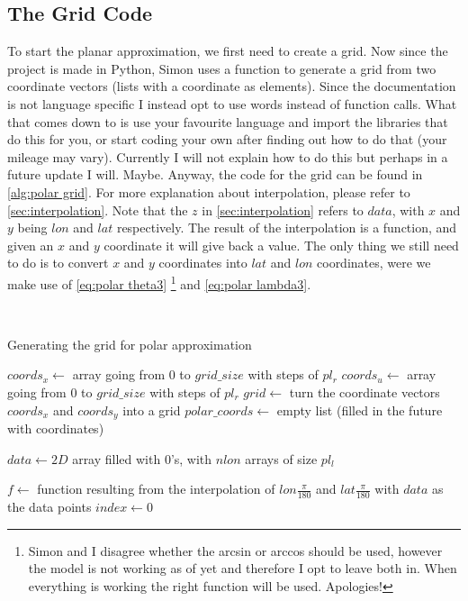 \subsection{The Grid Code}
To start the planar approximation, we first need to create a grid. Now since the project is made in Python, Simon uses a function to generate a grid from two coordinate vectors (lists with a 
coordinate as elements). Since the documentation is not language specific I instead opt to use words instead of function calls. What that comes down to is use your favourite language and import 
the libraries that do this for you, or start coding your own after finding out how to do that (your mileage may vary). Currently I will not explain how to do this but perhaps in a future update 
I will. Maybe. Anyway, the code for the grid can be found in \autoref{alg:polar grid}. For more explanation about interpolation, please refer to \autoref{sec:interpolation}. Note that the $z$ in 
\autoref{sec:interpolation} refers to $data$, with $x$ and $y$ being $lon$ and $lat$ respectively. The result of the interpolation is a function, and given an $x$ and $y$ coordinate it will give 
back a value. The only thing we still need to do is to convert $x$ and $y$ coordinates into $lat$ and $lon$ coordinates, were we make use of \autoref{eq:polar theta3} 
\footnote{Simon and I disagree whether the arcsin or arccos should be used, however the model is not working as of yet and therefore I opt to leave both in. When everything is working the right 
function will be used. Apologies!} and \autoref{eq:polar lambda3}.

\begin{algorithm}\
    \caption{Generating the grid for polar approximation}
    \label{alg:polar grid}
    $coords_x \leftarrow $ array going from $0$ to $grid\_size$ with steps of $pl_r$ \;
    $coords_u \leftarrow $ array going from $0$ to $grid\_size$ with steps of $pl_r$ \;
    $grid \leftarrow $ turn the coordinate vectors $coords_x$ and $coords_y$ into a grid \;
    $polar\_coords \leftarrow $ empty list (filled in the future with coordinates) \;


    $data \leftarrow 2D$ array filled with 0's, with $nlon$ arrays of size $pl_l$ \;


    $f \leftarrow$ function resulting from the interpolation of $lon \frac{\pi}{180}$ and $lat \frac{\pi}{180}$ with $data$ as the data points \;
    $index \leftarrow 0$ \;
\end{algorithm}